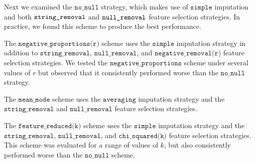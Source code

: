 \documentclass{article} %
\begin{document}
Next we examined the $\texttt{no\_null}$ strategy, which makes use of $\texttt{simple}$ imputation and both $\texttt{string\textunderscore removal}$ and $\texttt{null\textunderscore removal}$ feature selection strategies. In practice, we found this scheme to produce the best performance.

The $\texttt{negative\_proportions(r)}$ scheme uses the $\texttt{simple}$ imputation strategy in addition to $\texttt{string\_removal}$, $\texttt{null\_removal}$, and $\texttt{negative\_removal(r)}$ feature selection strategies. We tested the $\texttt{negative\_proportions}$ scheme under several values of $r$ but observed that it consistently performed worse than the $\texttt{no\_null}$ strategy.

The $\texttt{mean\_mode}$ scheme uses the $\texttt{averaging}$ imputation strategy and the $\texttt{string\_removal}$ and $\texttt{null\_removal}$ feature selection strategies.

The $\texttt{feature\_reduced(k)}$ scheme uses the $\texttt{simple}$ imputation strategy and the $\texttt{string\_removal}$, $\texttt{null\_removal}$, and $\texttt{chi\_squared(k)}$ feature selection strategies. This scheme was evaluated for a range of values of $k$, but also consistently performed worse than the $\texttt{no\_null}$ scheme.




\end{document}

